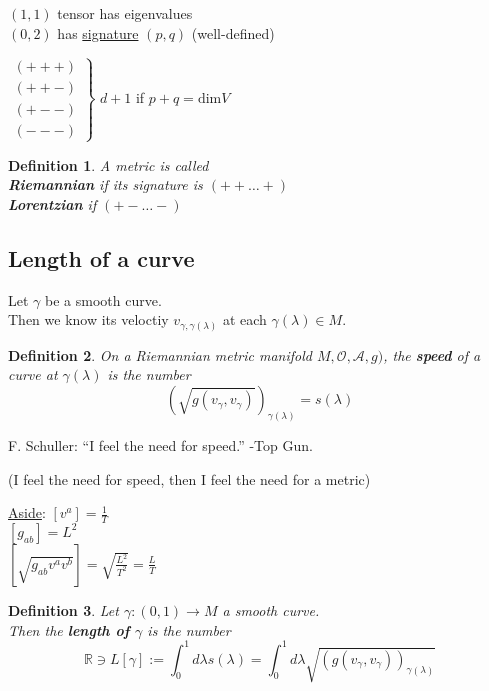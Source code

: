 \documentclass[10pt]{amsart}
\newtheorem{definition}{Definition}
\begin{document}
\begin{multicols*}{2}
	$(1,1)$ tensor has eigenvalues \\
	$(0,2)$ has \underline{signature} $(p,q)$ (well-defined)
	
	$\left. \begin{aligned}
	(+++) \\
	(++-) \\
	(+--) \\
	(---) \end{aligned} \right\rbrace$ $d+1$ if $p+q = \text{dim}V$
	
	
	\begin{definition} A metric is called  \\
		\textbf{Riemannian} if its signature is $(++ \dots +)$ \\
		\textbf{Lorentzian} if $(+-\dots -)$ 
	\end{definition}
	
	
	\subsection{Length of a curve}
	
	Let $\gamma$ be a smooth curve. \\
	Then we know its veloctiy $v_{\gamma, \gamma(\lambda)}$ at each $\gamma(\lambda) \in M$.  
	
	\begin{definition}
		On a Riemannian metric manifold $M, \mathcal{O},\mathcal{A},g)$, the \textbf{speed} of a curve at $\gamma(\lambda)$ is the number 
		\[
		(\sqrt{ g(v_{\gamma}, v_{\gamma}) })_{\gamma(\lambda)} = s(\lambda)
		\]
	\end{definition}
	
	F. Schuller: ``I feel the need for speed.'' -Top Gun.  
	
	(I feel the need for speed, then I feel the need for a metric)
	
	\underline{Aside}: $[v^a] = \frac{1}{T}$ \\
	\phantom{Aside:} $[g_{ab}] = L^2 $ \\
	\phantom{Aside:} $[\sqrt{g_{ab}v^av^b}] = \sqrt{ \frac{L^2}{T^2}} = \frac{L}{T}$
	
	\begin{definition}
		Let $\gamma:(0,1) \to M$ a smooth curve.  \\
		Then the \textbf{length of $\gamma$} is the number 
		\[
		\mathbb{R} \ni L[\gamma] := \int_0^1 d\lambda s(\lambda) = \int_0^1 d\lambda \sqrt{ (g(v_{\gamma}, v_{\gamma}))_{\gamma(\lambda)}}
		\]
	\end{definition}
	

\end{multicols*}
\end{document}
